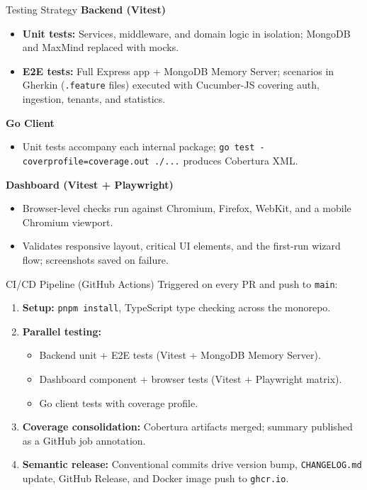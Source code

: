 \documentclass[aspectratio=169]{beamer}
\begin{document}
\begin{frame}{Testing Strategy}
    \textbf{Backend (Vitest)}
    \begin{itemize}
        \item \textbf{Unit tests:} Services, middleware, and domain logic in isolation;
              MongoDB and MaxMind replaced with mocks.
        \item \textbf{E2E tests:} Full Express app + MongoDB Memory Server; scenarios in
              Gherkin (\texttt{.feature} files) executed with Cucumber-JS covering auth,
              ingestion, tenants, and statistics.
    \end{itemize}
    \vspace{0.3cm}
    \textbf{Go Client}
    \begin{itemize}
        \item Unit tests accompany each internal package;
              \texttt{go test -coverprofile=coverage.out ./...} produces Cobertura XML.
    \end{itemize}
    \vspace{0.3cm}
    \textbf{Dashboard (Vitest + Playwright)}
    \begin{itemize}
        \item Browser-level checks run against Chromium, Firefox, WebKit, and a mobile
              Chromium viewport.
        \item Validates responsive layout, critical UI elements, and the first-run wizard
              flow; screenshots saved on failure.
    \end{itemize}
\end{frame}

\begin{frame}{CI/CD Pipeline (GitHub Actions)}
    Triggered on every PR and push to \texttt{main}:
    \vspace{0.3cm}
    \begin{enumerate}
        \item \textbf{Setup:} \texttt{pnpm install}, TypeScript type checking across the
              monorepo.
        \item \textbf{Parallel testing:}
        \begin{itemize}
            \item Backend unit + E2E tests (Vitest + MongoDB Memory Server).
            \item Dashboard component + browser tests (Vitest + Playwright matrix).
            \item Go client tests with coverage profile.
        \end{itemize}
        \item \textbf{Coverage consolidation:} Cobertura artifacts merged; summary
              published as a GitHub job annotation.
        \item \textbf{Semantic release:} Conventional commits drive version bump,
              \texttt{CHANGELOG.md} update, GitHub Release, and Docker image push to
              \texttt{ghcr.io}.
    \end{enumerate}
\end{frame}
\end{document}
